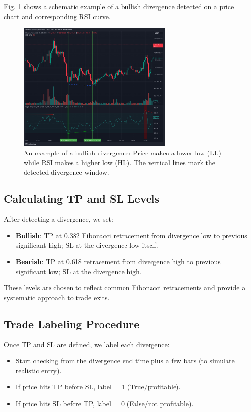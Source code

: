 \documentclass[letterpaper, 10 pt, conference]{ieeeconf}  %
\begin{document}
Fig. \ref{fig:bullish_div_example} shows a schematic example of a bullish divergence detected on a price chart and corresponding RSI curve.

\begin{figure}[thpb]
   \centering
   \includegraphics[width=3.0in]{fig1-bullish_divergence.png}
   \caption{An example of a bullish divergence: Price makes a lower low (LL) while RSI makes a higher low (HL). The vertical lines mark the detected divergence window.}
   \label{fig:bullish_div_example}
\end{figure}

\subsection{Calculating TP and SL Levels}
After detecting a divergence, we set:
\begin{itemize}
    \item \textbf{Bullish}: TP at 0.382 Fibonacci retracement from divergence low to previous significant high; SL at the divergence low itself.
    \item \textbf{Bearish}: TP at 0.618 retracement from divergence high to previous significant low; SL at the divergence high.
\end{itemize}

These levels are chosen to reflect common Fibonacci retracements and provide a systematic approach to trade exits.

\subsection{Trade Labeling Procedure}
Once TP and SL are defined, we label each divergence:
\begin{itemize}
    \item Start checking from the divergence end time plus a few bars (to simulate realistic entry).
    \item If price hits TP before SL, label = 1 (True/profitable).
    \item If price hits SL before TP, label = 0 (False/not profitable).
\end{itemize}
\end{document}
